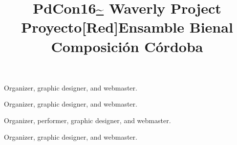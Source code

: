 \title{ PdCon16\url{~} }
\begin{position} 
Organizer, graphic designer, and webmaster.
\end{position}

\title{ Waverly Project }
\begin{position}
Organizer, graphic designer, and webmaster.
\end{position}

\title{ Proyecto[Red]Ensamble }
\begin{position} 
Organizer, performer, graphic designer, and webmaster.
\end{position}

\title{ Bienal Composición Córdoba }
\begin{position} 
Organizer, graphic designer, and webmaster.
\end{position}